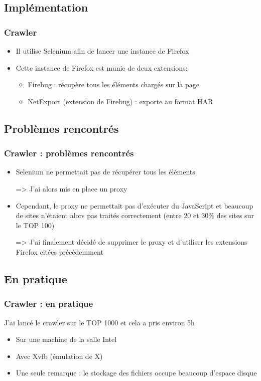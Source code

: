 \documentclass{beamer}
\begin{document}
  \subsection{Implémentation}
  \begin{frame}
  \frametitle{Crawler}
    \begin{itemize}
      \item Il utilise Selenium afin de lancer une instance de Firefox
      \item Cette instance de Firefox est munie de deux extensions:
        \begin{itemize}
          \item Firebug : récupère tous les éléments chargés sur la page
          \item NetExport (extension de Firebug) : exporte au format HAR
        \end{itemize}
    \end{itemize}
  \end{frame}
  
  \subsection{Problèmes rencontrés}
  \begin{frame}
  \frametitle{Crawler : problèmes rencontrés}
    \begin{itemize}
      \item Selenium ne permettait pas de récupérer tous les éléments
      
      => J'ai alors mis en place un proxy
      \item Cependant, le proxy ne permettait pas d'exécuter du JavaScript et beaucoup de sites n'étaient alors pas traités correctement (entre 20 et 30\% des sites sur le TOP 100)
      
      => J'ai finalement décidé de supprimer le proxy et d'utiliser les extensions Firefox citées précédemment
    \end{itemize}
  \end{frame}
  
  \subsection{En pratique}
  \begin{frame}
  \frametitle{Crawler : en pratique}
  J'ai lancé le crawler sur le TOP 1000 et cela a pris environ 5h
    \begin{itemize}
    \item Sur une machine de la salle Intel
    \item Avec Xvfb (émulation de X)
    \item Une seule remarque : le stockage des fichiers occupe beaucoup d'espace disque
    \end{itemize}
  \end{frame}
  
\end{document}
